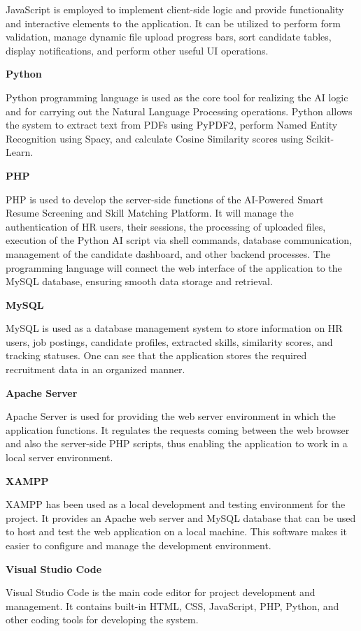 \documentclass[12pt,a4paper]{report}
\begin{document}
JavaScript is employed to implement client-side logic and provide functionality and interactive elements to the application. It can be utilized to perform form validation, manage dynamic file upload progress bars, sort candidate tables, display notifications, and perform other useful UI operations.

\textbf{Python}

Python programming language is used as the core tool for realizing the AI logic and for carrying out the Natural Language Processing operations. Python allows the system to extract text from PDFs using PyPDF2, perform Named Entity Recognition using Spacy, and calculate Cosine Similarity scores using Scikit-Learn.

\textbf{PHP}

PHP is used to develop the server-side functions of the AI-Powered Smart Resume Screening and Skill Matching Platform. It will manage the authentication of HR users, their sessions, the processing of uploaded files, execution of the Python AI script via shell commands, database communication, management of the candidate dashboard, and other backend processes. The programming language will connect the web interface of the application to the MySQL database, ensuring smooth data storage and retrieval.

\textbf{MySQL}

MySQL is used as a database management system to store information on HR users, job postings, candidate profiles, extracted skills, similarity scores, and tracking statuses. One can see that the application stores the required recruitment data in an organized manner.

\textbf{Apache Server}

Apache Server is used for providing the web server environment in which the application functions. It regulates the requests coming between the web browser and also the server-side PHP scripts, thus enabling the application to work in a local server environment.

\textbf{XAMPP}

XAMPP has been used as a local development and testing environment for the project. It provides an Apache web server and MySQL database that can be used to host and test the web application on a local machine. This software makes it easier to configure and manage the development environment.

\textbf{Visual Studio Code}

Visual Studio Code is the main code editor for project development and management. It contains built-in HTML, CSS, JavaScript, PHP, Python, and other coding tools for developing the system.
\end{document}
